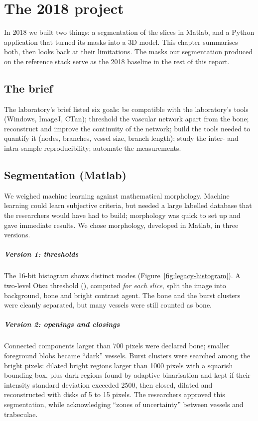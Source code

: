 \chapter{The 2018 project}
\label{chap:legacy}

In 2018 we built two things: a segmentation of the slices in Matlab, and a Python application that
turned its masks into a 3D model. This chapter summarises both, then looks back at their limitations.
The masks our segmentation produced on the reference stack serve as the 2018 baseline in the rest of
this report.

\section{The brief}

The laboratory's brief listed six goals: be compatible with the laboratory's tools (Windows, ImageJ,
CTan); threshold the vascular network apart from the bone; reconstruct and improve the continuity of
the network; build the tools needed to quantify it (nodes, branches, vessel size, branch length);
study the inter- and intra-sample reproducibility; automate the measurements.

\section{Segmentation (Matlab)}

We weighed machine learning against mathematical morphology. Machine learning could learn subjective
criteria, but needed a large labelled database that the researchers would have had to build;
morphology was quick to set up and gave immediate results. We chose morphology, developed in Matlab,
in three versions.

\paragraph{Version 1: thresholds} The 16-bit histogram shows distinct modes
(Figure~\ref{fig:legacy-histogram}). A two-level Otsu threshold (), computed
\emph{for each slice}, split the image into background, bone and bright contrast agent. The bone and
the burst clusters were cleanly separated, but many vessels were still counted as bone.

\paragraph{Version 2: openings and closings} Connected components larger than 700 pixels were
declared bone; smaller foreground blobs became ``dark'' vessels. Burst clusters were searched among the
bright pixels: dilated bright regions larger than 1000 pixels with a squarish bounding box, plus dark
regions found by adaptive binarisation and kept if their intensity standard deviation exceeded 2500,
then closed, dilated and reconstructed with disks of 5 to 15 pixels. The researchers approved this
segmentation, while acknowledging ``zones of uncertainty'' between vessels and trabeculae.

